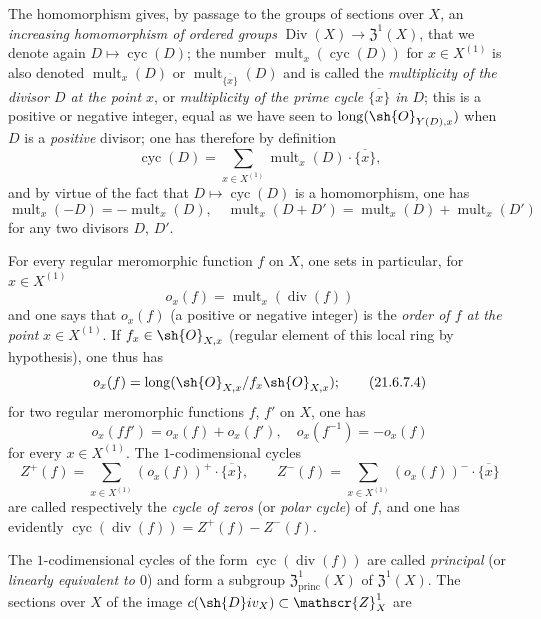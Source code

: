 \begin{env}[21.6.7]
\label{IV.21.6.7}
The homomorphism  gives, by passage to the groups of sections over $X$, an \emph{increasing homomorphism of ordered groups} $\operatorname{Div}(X)\to\mathfrak{Z}^1(X)$, that we denote again $D\mapsto\operatorname{cyc}(D)$;
the number $\operatorname{mult}_x(\operatorname{cyc}(D))$ for $x\in X^{(1)}$ is also denoted $\operatorname{mult}_x(D)$ or $\operatorname{mult}_{\overline{\{x\}}}(D)$ and is called the \emph{multiplicity of the divisor $D$ at the point $x$}, or \emph{multiplicity of the prime cycle $\overline{\{x\}}$ in $D$};
this is a positive or negative integer, equal as we have seen to $\operatorname{long}(\sh{O}_{Y(D),x})$ when $D$ is a \emph{positive} divisor;
one has therefore by definition
\[
\label{IV.21.6.7.1}
  \operatorname{cyc}(D)=\sum_{x\in X^{(1)}}\operatorname{mult}_x(D)\cdot\overline{\{x\}},
  \tag{21.6.7.1}
\]
and by virtue of the fact that $D\mapsto\operatorname{cyc}(D)$ is a homomorphism, one has
\[
\label{IV.21.6.7.2}
  \operatorname{mult}_x(-D)=-\operatorname{mult}_x(D),\quad\operatorname{mult}_x(D+D')=\operatorname{mult}_x(D)+\operatorname{mult}_x(D')
  \tag{21.6.7.2}
\]
for any two divisors $D$, $D'$.

For every regular meromorphic function $f$ on $X$, one sets in particular, for $x\in X^{(1)}$
\[
\label{IV.21.6.7.3}
  o_x(f)=\operatorname{mult}_x(\operatorname{div}(f))
  \tag{21.6.7.3}
\]
and one says that $o_x(f)$ (a positive or negative integer) is the \emph{order of $f$ at the point} $x\in X^{(1)}$.
If $f_x\in\sh{O}_{X,x}$ (regular element of this local ring by hypothesis), one thus has
\[
\label{IV.21.6.7.4}
  o_x(f)=\operatorname{long}(\sh{O}_{X,x}/f_x\sh{O}_{X,x});
  \tag{21.6.7.4}
\]
for two regular meromorphic functions $f$, $f'$ on $X$, one has
\[
\label{IV.21.6.7.5}
  o_x(ff')=o_x(f)+o_x(f'),\quad o_x(f^{-1})=-o_x(f)
  \tag{21.6.7.5}
\]
for every $x\in X^{(1)}$.
The $1$-codimensional cycles
\[
  Z^+(f)=\sum_{x\in X^{(1)}}(o_x(f))^+\cdot\overline{\{x\}},\qquad Z^-(f)=\sum_{x\in X^{(1)}}(o_x(f))^-\cdot\overline{\{x\}}
\]
are called respectively the \emph{cycle of zeros} (or \emph{polar cycle}) of $f$, and one has evidently $\operatorname{cyc}(\operatorname{div}(f))=Z^+(f)-Z^-(f)$.

The $1$-codimensional cycles of the form $\operatorname{cyc}(\operatorname{div}(f))$ are called \emph{principal} (or \emph{linearly equivalent to $0$}) and form a subgroup $\mathfrak{Z}^1_{\mathrm{princ}}(X)$ of $\mathfrak{Z}^1(X)$.
The sections over $X$ of the image $c(\sh{D}iv_X)\subset\mathscr{Z}_X^1$ are
\end{env}


